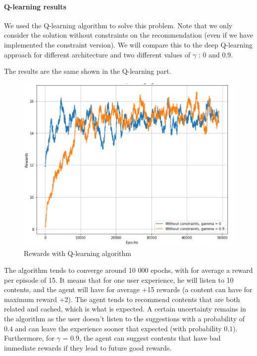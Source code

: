 \documentclass[a4paper]{article}
\begin{document}
    \paragraph{Q-learning results}
     We used the Q-learning algorithm to solve this problem. Note that we only consider the solution without constraints on the recommendation (even if we have implemented the constraint version). We will compare this to the deep Q-learning approach for different architecture and two different values of $\gamma$ : 0 and 0.9. 
     
    
   The results are the same shown in the Q-learning part.
    
    \begin{figure}[h!]
        \centering
        \includegraphics[scale = 0.2]{img/rewards_q_learning.png}
        \caption{Rewards with Q-learning algorithm}
        \label{fig:my_label}
    \end{figure}
    
    
    
    
    
    
    The algorithm tends to converge around 10 000 epochs, with for average a reward per episode of 15. It means that for one user experience, he will listen to 10 contents, and the agent will have for average +15 rewards (a content can have for maximum reward +2). The agent tends to recommend contents that are both related and cached, which is what is expected. A certain uncertainty remains in the algorithm as the user doesn't listen to the suggestions with a probability of $0.4$ and can leave the experience sooner that expected (with probability $0.1$). Furthermore, for $\gamma $ = 0.9, the agent can suggest contents that have bad immediate rewards if they lead to future good rewards.
    
\end{document}
